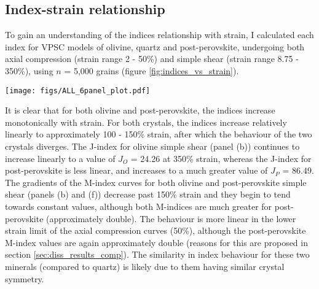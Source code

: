 \documentclass[a4paper,12pt,twoside]{report}
\numberwithin{equation}{chapter}
\begin{document}
\subsection{Index-strain relationship}

To gain an understanding of the indices relationship with strain, I calculated each index for VPSC models of olivine, quartz and post-perovskite, undergoing both axial compression (strain range 2 - 50\%) and simple shear (strain range 8.75 - 350\%), using $n$ = 5,000 grains (figure \ref{fig:indices_vs_strain}).     

\begin{figure*}[p]
  \centering
    \texttt{[image: figs/ALL\_6panel\_plot.pdf]}
  \caption[Relation of indices to strain (VPSC)]{Relationship between the J-index, continuous M-index and discrete M-index to sample strain. Data are from VPSC models, with the indices calculated using the same 5,000 grains at each strain step (this many grains ensures the results are in the convergent regime). Discrete M-index calculated with a bin size of 0.25$^\circ$. \textbf{Top row} shows data for olivine, \textbf{middle row} shows quartz and \textbf{bottom row} shows post-perovskite (P-PS). \textbf{Left column} shows data from an axial compression VPSC model, the \textbf{right column} shows data from a simple shear VPSC model. Note the change of scale on both y-axes in \textbf{f}. Applying these scales to other plots reduces clarity --- consistent scales on all other plots (within each column) allows for useful comparison (see text).}
  \label{fig:indices_vs_strain}
\end{figure*} 

It is clear that for both olivine and post-perovskite, the indices increase monotonically with strain. For both crystals, the indices increase relatively linearly to approximately 100 - 150\% strain, after which the behaviour of the two crystals diverges. The J-index for olivine simple shear (panel (b)) continues to increase linearly to a value of $J_O$ = 24.26 at 350\% strain, whereas the J-index for post-perovskite is less linear, and increases to a much greater value of $J_P$ = 86.49. The gradients of the M-index curves for both olivine and post-perovskite simple shear (panels (b) and (f)) decrease past 150\% strain and they begin to tend towards constant values, although both M-indices are much greater for post-perovskite (approximately double). The behaviour is more linear in the lower strain limit of the axial compression curves (50\%), although the post-perovskite M-index values are again approximately double (reasons for this are proposed in section \ref{sec:diss_results_comp}). The similarity in index behaviour for these two minerals (compared to quartz) is likely due to them having similar crystal symmetry.
\end{document}

